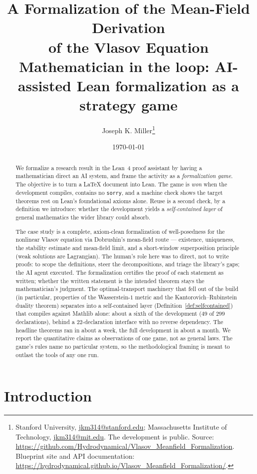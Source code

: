 \documentclass[11pt]{article}
\title{\textbf{A Formalization of the Mean-Field Derivation\\ of the Vlasov Equation}\\[2pt]
\large Mathematician in the loop: AI-assisted Lean formalization as a strategy game}
\author{Joseph K. Miller\thanks{%
  Stanford University, \href{mailto:jkm314@stanford.edu}{jkm314@stanford.edu};
  Massachusetts Institute of Technology, \href{mailto:jkm314@mit.edu}{jkm314@mit.edu}.
  The development is public. Source:
  \url{https://github.com/Hydrodynamical/Vlasov_Meanfield_Formalization}. Blueprint site
  and API documentation:
  \url{https://hydrodynamical.github.io/Vlasov_Meanfield_Formalization/}.}}
\date{\today}
\theoremstyle{plain}
\theoremstyle{definition}
\theoremstyle{remark}
\newcommand{\lean}[1]{\texttt{#1}}
\begin{document}
\maketitle

\begin{abstract}
We formalize a research result in the Lean~4 proof assistant by having a
mathematician direct an AI system, and frame the activity as a \emph{formalization game}. The
objective is to turn a \LaTeX{} document into Lean. The game is \emph{won} when the
development compiles, contains no \lean{sorry}, and a machine check shows the target
theorems rest on Lean's foundational axioms alone. Reuse is a second check, by a
definition we introduce: whether the development yields a \emph{self-contained layer}
of general mathematics the wider library could absorb.

The case study is a complete, axiom-clean formalization of well-posedness for the
nonlinear Vlasov equation via Dobrushin's mean-field route --- existence, uniqueness, the
stability estimate and mean-field limit, and a short-window superposition principle
(weak solutions are Lagrangian). The human's
role here was to direct, not to write proofs: to scope the definitions, steer the
decompositions, and triage the library's gaps; the AI agent executed. The formalization certifies the
proof of each statement as written; whether the written statement is the intended
theorem stays the mathematician's judgment. The optimal-transport
machinery that fell out of the build (in particular, properties of the Wasserstein-$1$
metric and the Kantorovich--Rubinstein duality theorem) separates into a self-contained layer
(Definition~\ref{def:selfcontained}) that compiles against Mathlib alone: about a
sixth of the development ($49$ of $299$ declarations), behind a $22$-declaration
interface with no reverse dependency. The headline theorems ran in about a week, the
full development in about a month. We report
the quantitative claims as observations of one game, not as general laws. The game's
rules name no particular system, so the methodological framing is meant to outlast the tools of any
one run.
\end{abstract}

\tableofcontents

\section{Introduction}
\end{document}
